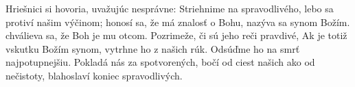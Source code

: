 Hriešnici si hovoria, uvažujúc nesprávne:
Striehnime na spravodlivého, lebo sa protiví našim výčinom;
honosí sa, že má znalosť o Bohu,
nazýva sa synom Božím. chválieva sa, že Boh je mu otcom.
\versseparator
Pozrimeže, či sú jeho reči pravdivé,
Ak je totiž vskutku Božím synom, vytrhne ho z našich rúk.
Odsúďme ho na smrť najpotupnejšiu.
\versseparator
Pokladá nás za spotvorených,
bočí od ciest našich ako od nečistoty,
blahoslaví koniec spravodlivých.